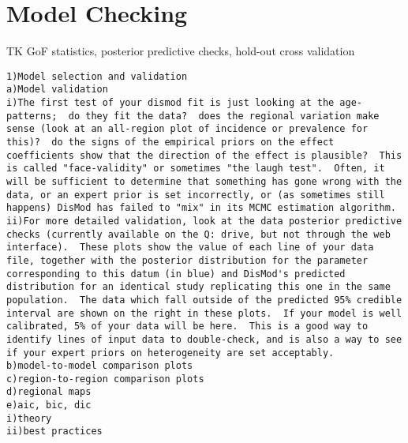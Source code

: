 \section{Model Checking}

TK GoF statistics, posterior predictive checks, hold-out cross
validation

\begin{verbatim}
1)Model selection and validation
a)Model validation
i)The first test of your dismod fit is just looking at the age-patterns;  do they fit the data?  does the regional variation make sense (look at an all-region plot of incidence or prevalence for this)?  do the signs of the empirical priors on the effect coefficients show that the direction of the effect is plausible?  This is called "face-validity" or sometimes "the laugh test".  Often, it will be sufficient to determine that something has gone wrong with the data, or an expert prior is set incorrectly, or (as sometimes still happens) DisMod has failed to "mix" in its MCMC estimation algorithm.
ii)For more detailed validation, look at the data posterior predictive checks (currently available on the Q: drive, but not through the web interface).  These plots show the value of each line of your data file, together with the posterior distribution for the parameter corresponding to this datum (in blue) and DisMod's predicted distribution for an identical study replicating this one in the same population.  The data which fall outside of the predicted 95% credible interval are shown on the right in these plots.  If your model is well calibrated, 5% of your data will be here.  This is a good way to identify lines of input data to double-check, and is also a way to see if your expert priors on heterogeneity are set acceptably.
b)model-to-model comparison plots
c)region-to-region comparison plots
d)regional maps
e)aic, bic, dic
i)theory
ii)best practices

\end{verbatim}

